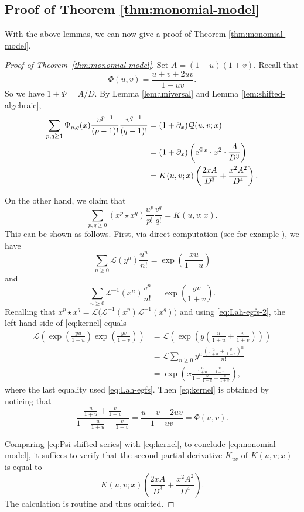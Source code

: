 \documentclass[12pt,a4paper,reqno]{amsart}
\numberwithin{equation}{section}
\theoremstyle{definition}
\theoremstyle{remark}
\newcommand{\Lah}{\mathcal L}
\newcommand{\e}{\mathrm e}
\begin{document}
\subsection{Proof of Theorem \ref{thm:monomial-model}}

With the above lemmas, we can now give a proof of Theorem \ref{thm:monomial-model}. 

\begin{proof}[Proof of Theorem~\ref{thm:monomial-model}]
Set $A=(1+u)(1+v)$. Recall that 
\[
 \Phi(u,v)=\frac{u+v+2uv}{1-uv}.
\]
So we have $1+\Phi=A/D$.  By
Lemma \ref{lem:universal} and Lemma \ref{lem:shifted-algebraic},
\begin{align}
 \sum_{p,q\geq1}\Psi_{p,q}(x)
 \frac{u^{p-1}}{(p-1)!}\frac{v^{q-1}}{(q-1)!}
 &=(1+\partial_x)\mathcal Q(u,v;x)\notag\\
 &=(1+\partial_x)\left(\e^{\Phi x}\cdot x^2\cdot \frac{A}{D^3}\right)\notag\\
 &=K(u,v;x)\left(\frac{2xA}{D^3}+\frac{x^2A^2}{D^4}\right).
 \label{eq:Psi-shifted-series}
\end{align}


On the other hand, we claim that 
\begin{equation}\label{eq:kernel}
 \sum_{p,q\ge0}(x^p\star x^q)
     \frac{u^p}{p!}\frac{v^q}{q!}
 =K(u,v;x).
\end{equation}
This can be shown as follows.
First, via direct computation (see for example \cite[Proposition 5.17(b) and (f)]{BRW94}), we have 
\begin{equation}\label{eq:Lah-egfs}
 \sum_{n\ge0}\Lah(y^n)\frac{u^n}{n!}
   =\exp\left(\frac{xu}{1-u}\right)
\end{equation}
and 
\begin{equation}\label{eq:Lah-egfs-2}
 \sum_{n\ge0}\Lah^{-1}(x^n)\frac{v^n}{n!}
   =\exp\left(\frac{yv}{1+v}\right).
\end{equation}
Recalling that $x^p\star x^q
 =\Lah\bigl(\Lah^{-1}(x^p)\Lah^{-1}(x^q)\bigr)$
and using  \eqref{eq:Lah-egfs-2},  the left-hand side of
\eqref{eq:kernel} equals
\begin{align*}
 \Lah\left(
  \exp\left(\frac{yu}{1+u}\right)
  \exp\left(\frac{yv}{1+v}\right)
 \right)
 &=\Lah\left(
  \exp\left(y\left(\frac{u}{1+u}+\frac{v}{1+v}\right)\right)
 \right) \\
 &=\Lah\sum_{n\geq 0}y^n\frac{\left(\frac{u}{1+u}+\frac{v}{1+v}\right)^n}{n!}\\
 &=\exp\left(
  x\frac{\frac{u}{1+u}+\frac{v}{1+v}}
          {1-\frac{u}{1+u}-\frac{v}{1+v}}
 \right),
\end{align*}
where the last equality used \eqref{eq:Lah-egfs}. Then \eqref{eq:kernel} is obtained   by noticing  that 
\[
\frac{\frac{u}{1+u}+\frac{v}{1+v}}
          {1-\frac{u}{1+u}-\frac{v}{1+v}}=\frac{u+v+2uv}{1-uv}=\Phi(u,v).
\]
 

Comparing  \eqref{eq:Psi-shifted-series} with
\eqref{eq:kernel}, to conclude \eqref{eq:monomial-model}, it suffices to verify that 
the second partial derivative $K_{uv}$ of $K(u,v;x)$ is equal to 
\[
 K(u,v;x)\left(\frac{2xA}{D^3}+\frac{x^2A^2}{D^4}\right).
\]
The calculation is routine and thus omitted.  
\end{proof}
\end{document}
